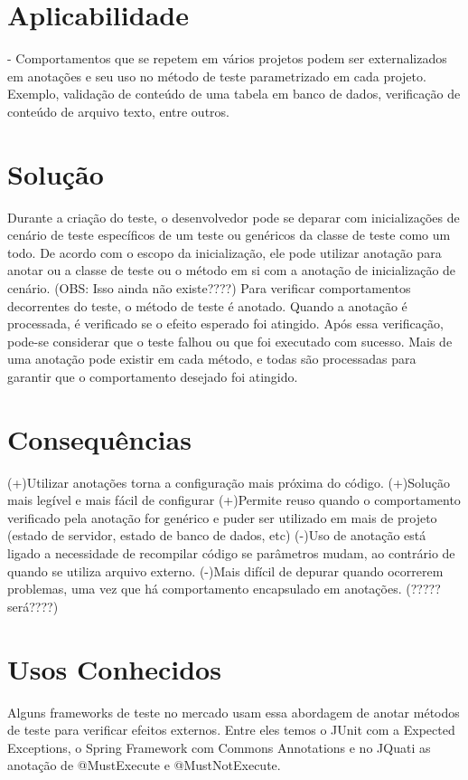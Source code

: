 \documentclass[12pt,a4paper,oneside]{book}
\begin{document}
\section{Aplicabilidade}
- Comportamentos que se repetem em vários projetos podem ser externalizados em anotações e seu uso no método de teste parametrizado em cada projeto. Exemplo, validação de conteúdo de uma tabela em banco de dados, verificação de conteúdo de arquivo texto, entre outros.


\section{Solução}
Durante a criação do teste, o desenvolvedor pode se deparar com inicializações de cenário de teste específicos de um teste ou genéricos da classe de teste como um todo. De acordo com o escopo da inicialização, ele pode utilizar anotação para anotar ou a classe de teste ou o método em si com a anotação de inicialização de cenário. (OBS: Isso ainda não existe????)
Para verificar comportamentos decorrentes do teste, o método de teste é anotado. Quando a anotação é processada, é verificado se o efeito esperado foi atingido. Após essa verificação, pode-se considerar que o teste falhou ou que foi executado com sucesso. Mais de uma anotação pode existir em cada método, e todas são processadas para garantir que o comportamento desejado foi atingido.

\section{Consequências}
(+)Utilizar anotações torna a configuração mais próxima do código.
(+)Solução mais legível e mais fácil de configurar
(+)Permite reuso quando o comportamento verificado pela anotação for genérico e puder ser utilizado em mais de projeto (estado de servidor, estado de banco de dados, etc)
(-)Uso de anotação está ligado a necessidade de recompilar código se parâmetros mudam, ao contrário de quando se utiliza arquivo externo.
(-)Mais difícil de depurar quando ocorrerem problemas, uma vez que há comportamento encapsulado em anotações. (????? será????)


\section{Usos Conhecidos}
Alguns frameworks de teste no mercado usam essa abordagem de anotar métodos de teste para verificar efeitos externos. Entre eles temos o JUnit com a Expected Exceptions, o Spring Framework com Commons Annotations e no JQuati as anotação de @MustExecute e @MustNotExecute.
\end{document}
